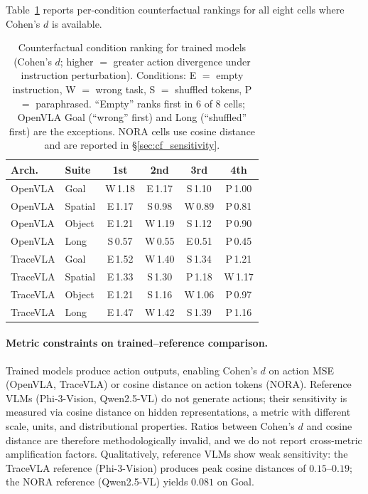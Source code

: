 Table~\ref{tab:counterfactual} reports per-condition counterfactual rankings for all eight cells where Cohen's $d$ is available.

\begin{table}[h]
\centering
\caption{Counterfactual condition ranking for trained models (Cohen's $d$; higher $=$ greater action divergence under instruction perturbation). Conditions: E $=$ empty instruction, W $=$ wrong task, S $=$ shuffled tokens, P $=$ paraphrased. ``Empty'' ranks first in 6 of 8 cells; OpenVLA Goal (``wrong'' first) and Long (``shuffled'' first) are the exceptions. NORA cells use cosine distance and are reported in \S\ref{sec:cf_sensitivity}.}
\label{tab:counterfactual}
\small
\begin{tabular}{llcccc}
\toprule
\textbf{Arch.} & \textbf{Suite} & \textbf{1st} & \textbf{2nd} & \textbf{3rd} & \textbf{4th} \\
\midrule
OpenVLA & Goal    & W\,1.18 & E\,1.17 & S\,1.10 & P\,1.00 \\
OpenVLA & Spatial & E\,1.17 & S\,0.98 & W\,0.89 & P\,0.81 \\
OpenVLA & Object  & E\,1.21 & W\,1.19 & S\,1.12 & P\,0.90 \\
OpenVLA & Long    & S\,0.57 & W\,0.55 & E\,0.51 & P\,0.45 \\
\midrule
TraceVLA & Goal    & E\,1.52 & W\,1.40 & S\,1.34 & P\,1.21 \\
TraceVLA & Spatial & E\,1.33 & S\,1.30 & P\,1.18 & W\,1.17 \\
TraceVLA & Object  & E\,1.21 & S\,1.16 & W\,1.06 & P\,0.97 \\
TraceVLA & Long    & E\,1.47 & W\,1.42 & S\,1.39 & P\,1.16 \\
\bottomrule
\end{tabular}
\end{table}

\paragraph{Metric constraints on trained--reference comparison.}
Trained models produce action outputs, enabling Cohen's $d$ on action MSE (OpenVLA, TraceVLA) or cosine distance on action tokens (NORA).
Reference VLMs (Phi-3-Vision, Qwen2.5-VL) do not generate actions; their sensitivity is measured via cosine distance on hidden representations, a metric with different scale, units, and distributional properties.
Ratios between Cohen's $d$ and cosine distance are therefore methodologically invalid, and we do not report cross-metric amplification factors.
Qualitatively, reference VLMs show weak sensitivity: the TraceVLA reference (Phi-3-Vision) produces peak cosine distances of $0.15$--$0.19$; the NORA reference (Qwen2.5-VL) yields $0.081$ on Goal.

